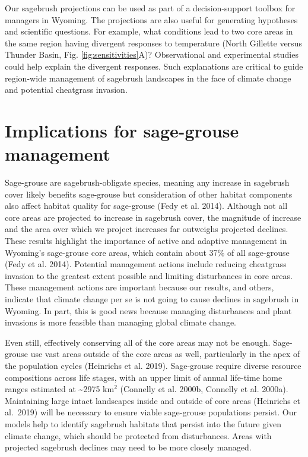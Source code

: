 \documentclass[
  12pt,
]{article}
\begin{document}
Our sagebrush projections can be used as part of a decision-support toolbox for managers in Wyoming.
The projections are also useful for generating hypotheses and scientific questions.
For example, what conditions lead to two core areas in the same region having divergent responses to temperature (North Gillette versus Thunder Basin, Fig. \ref{fig:sensitivities}A)?
Observational and experimental studies could help explain the divergent responses.
Such explanations are critical to guide region-wide management of sagebrush landscapes in the face of climate change and potential cheatgrass invasion.

\hypertarget{implications-for-sage-grouse-management}{%
\section{Implications for sage-grouse management}\label{implications-for-sage-grouse-management}}

Sage-grouse are sagebrush-obligate species, meaning any increase in sagebrush cover likely benefits sage-grouse but consideration of other habitat components also affect habitat quality for sage-grouse (Fedy et al. 2014).
Although not all core areas are projected to increase in sagebrush cover, the magnitude of increase and the area over which we project increases far outweighs projected declines.
These results highlight the importance of active and adaptive management in Wyoming's sage-grouse core areas, which contain about 37\% of all sage-grouse (Fedy et al. 2014).
Potential management actions include reducing cheatgrass invasion to the greatest extent possible and limiting disturbances in core areas.
These management actions are important because our results, and others, indicate that climate change per se is not going to cause declines in sagebrush in Wyoming.
In part, this is good news because managing disturbances and plant invasions is more feasible than managing global climate change.

Even still, effectively conserving all of the core areas may not be enough.
Sage-grouse use vast areas outside of the core areas as well, particularly in the apex of the population cycles (Heinrichs et al. 2019).
Sage-grouse require diverse resource compositions across life stages, with an upper limit of annual life-time home ranges estimated at \textasciitilde2975 km\(^2\) (Connelly et al. 2000b, Connelly et al. 2000a).
Maintaining large intact landscapes inside and outside of core areas (Heinrichs et al.~2019) will be necessary to ensure viable sage-grouse populations persist.
Our models help to identify sagebrush habitats that persist into the future given climate change, which should be protected from disturbances.
Areas with projected sagebrush declines may need to be more closely managed.
\end{document}
